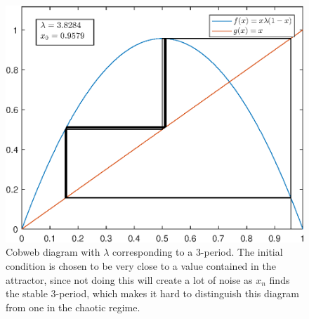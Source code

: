 \documentclass[12pt,oneside,a4paper]{article}
\numberwithin{equation}{section}
\begin{document}
{{\begin{figure}
	\centering
	\includegraphics[width=0.7\linewidth]{Figures/cobweb_x10_l38_iter100}
	\caption{Cobweb diagram with $\lambda$ corresponding to a 3-period. The initial condition is chosen to be very close to a value contained in the attractor, since not doing this will create a lot of noise as $x_n$ finds the stable 3-period, which makes it hard to distinguish this diagram from one in the chaotic regime.}
	\label{fig:cobwebx10l38iter100}
\end{figure}
}}
\end{document}
